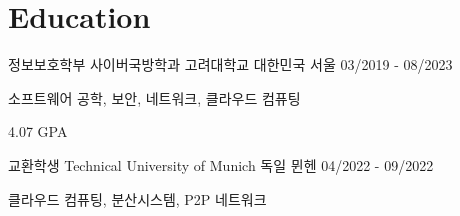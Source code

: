 \vspace{-\acvSectionTopSkip}
\section{Education}
\cventry
{정보보호학부 사이버국방학과} %
{고려대학교} %
{대한민국 서울} %
{03/2019 - 08/2023} %
\begin{cvitems}
\item {소프트웨어 공학, 보안, 네트워크, 클라우드 컴퓨팅}
\item {4.07 GPA}
\end{cvitems}

\cventry
{교환학생} %
{Technical University of Munich} %
{독일 뮌헨} %
{04/2022 - 09/2022} %
\begin{cvitems}
\item {클라우드 컴퓨팅, 분산시스템, P2P 네트워크}
\end{cvitems}
